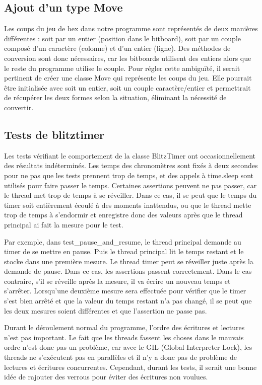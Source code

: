 \documentclass[12pt]{article}
\begin{document}
\subsection{Ajout d’un type Move} \label{crit-move}

Les coups du jeu de hex dans notre programme sont représentés de deux manières différentes : soit par un entier (position dans le bitboard), soit par un couple composé d’un caractère (colonne) et d’un entier (ligne). Des méthodes de conversion sont donc nécessaires, car les bitboards utilisent des entiers alors que le reste du programme utilise le couple. Pour régler cette ambiguïté, il serait pertinent de créer une classe Move qui représente les coups du jeu. Elle pourrait être initialisée avec soit un entier, soit un couple caractère/entier et permettrait de récupérer les deux formes selon la situation, éliminant la nécessité de convertir.

\subsection{Tests de blitztimer} \label{crit-blitz}

Les tests vérifiant le comportement de la classe BlitzTimer ont occasionnellement des résultats indéterminés. Les temps des chronomètres sont fixés à deux secondes pour ne pas que les tests prennent trop de temps, et des appels à time.sleep sont utilisés pour faire passer le temps. Certaines assertions peuvent ne pas passer, car le thread met trop de temps à se réveiller. Dans ce cas, il se peut que le temps du timer soit entièrement écoulé à des moments inattendus, ou que le thread mette trop de temps à s’endormir et enregistre donc des valeurs après que le thread principal ai fait la mesure pour le test.

\bigskip
Par exemple, dans test\_pause\_and\_resume, le thread principal demande au timer de se mettre en pause. Puis le thread principal lit le temps restant et le stocke dans une première mesure. Le thread timer peut se réveiller juste après la demande de pause. Dans ce cas, les assertions passent correctement. Dans le cas contraire, s'il se réveille après la mesure, il va écrire un nouveau temps et s’arrêter. Lorsqu'une deuxième mesure sera effectuée pour vérifier que le timer s’est bien arrêté et que la valeur du temps restant n’a pas changé, il se peut que les deux mesures soient différentes et que l’assertion ne passe pas.

\bigskip
Durant le déroulement normal du programme, l’ordre des écritures et lectures n’est pas important. Le fait que les threads fassent les choses dans le mauvais ordre n’est donc pas un problème, car avec le GIL (Global Interpreter Lock), les threads ne s’exécutent pas en parallèles et il n'y a donc pas de problème de lectures et écritures concurrentes. Cependant, durant les tests, il serait une bonne idée de rajouter des verrous pour éviter des écritures non voulues.
\end{document}

